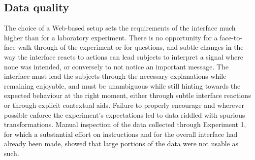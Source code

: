 \subsection{Data quality}\label{data-quality}

The choice of a Web-based setup sets the requirements of the interface
much higher than for a laboratory experiment. There is no opportunity
for a face-to-face walk-through of the experiment or for questions, and
subtle changes in the way the interface reacts to actions can lead
subjects to interpret a signal where none was intended, or conversely to
not notice an important message. 
The interface must lead the subjects through the
necessary explanations while remaining enjoyable, and must be
unambiguous while still hinting towards the expected behaviour at the
right moment, either through subtle interface reactions or through
explicit contextual aids.
Failure to properly encourage and wherever possible enforce the
experiment's expectations led to data riddled with spurious
transformations. Manual inspection of the data collected through
Experiment 1, for which a substantial effort on instructions and for the
overall interface had already been made, showed that large portions of
the data were not usable as such. 

